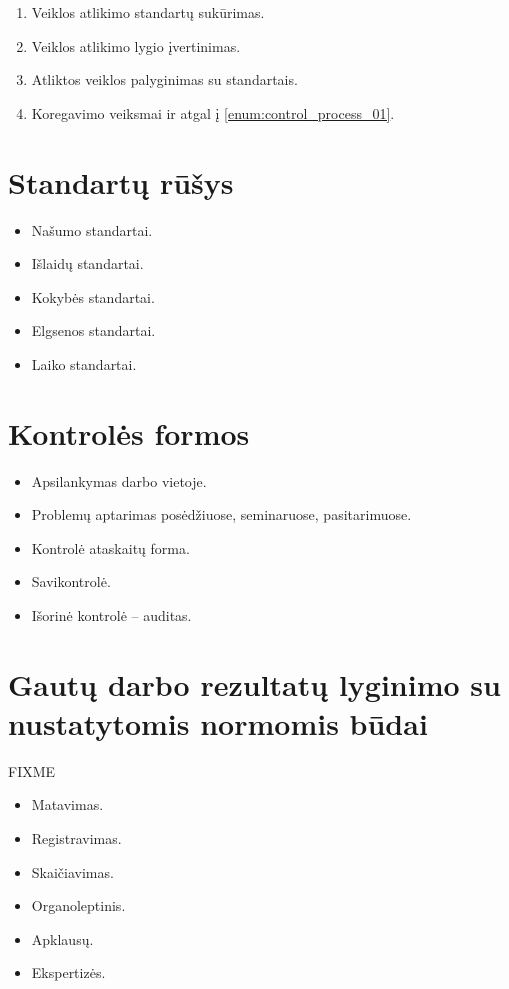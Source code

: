 \begin{enumerate}
  \item \label{enum:control_process_01} Veiklos atlikimo standartų
    sukūrimas.
  \item Veiklos atlikimo lygio įvertinimas.
  \item Atliktos veiklos palyginimas su standartais.
  \item Koregavimo veiksmai ir atgal į \ref{enum:control_process_01}.
\end{enumerate}

\section{Standartų rūšys}

\begin{itemize}
  \item Našumo standartai.
  \item Išlaidų standartai.
  \item Kokybės standartai.
  \item Elgsenos standartai.
  \item Laiko standartai.
\end{itemize}

\section{Kontrolės formos}

\begin{itemize}
  \item Apsilankymas darbo vietoje.
  \item Problemų aptarimas posėdžiuose, seminaruose, pasitarimuose.
  \item Kontrolė ataskaitų forma.
  \item Savikontrolė.
  \item Išorinė kontrolė – auditas.
\end{itemize}

\section{Gautų darbo rezultatų lyginimo su nustatytomis normomis būdai}

FIXME

\begin{itemize}
  \item Matavimas.
  \item Registravimas.
  \item Skaičiavimas.
  \item Organoleptinis.
  \item Apklausų.
  \item Ekspertizės.
\end{itemize}


